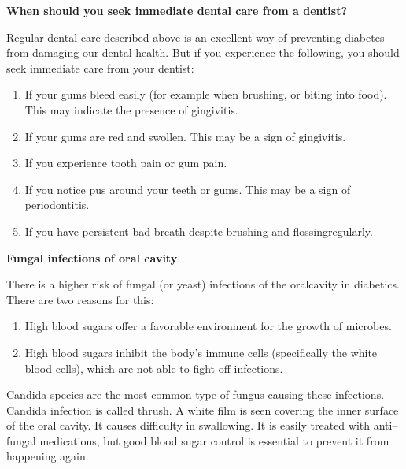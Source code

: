 \noindent\textbf{When should you seek immediate dental care from a dentist?}

Regular dental care described above is an excellent way of preve\-nting diabetes from damaging our dental health. But if you experience the following, you should seek immediate care from your dentist:

\vspace{-\topsep}
\begin{enumerate}[•]
\itemsep=0pt
\item If your gums bleed easily (for example when brushing, or biting into food). This may indicate the presence of gingivitis.
\item If your gums are red and swollen. This may be a sign of gingivitis.
\item If you experience tooth pain or gum pain.
\item If you notice pus around your teeth or gums. This may be a sign of periodontitis.
\item If you have persistent bad breath despite brushing and flossing\break regularly.
\end{enumerate}
\vspace{-\topsep}

\noindent\textbf{Fungal infections of oral cavity}

There is a higher risk of fungal (or yeast) infections of the oral\break cavity in diabetics. There are two reasons for this:

\vspace{-\topsep}
\begin{enumerate}[•]
\itemsep=0pt
\item High blood sugars offer a favorable environment for the growth of microbes.
\item High blood sugars inhibit the body’s immune cells (specifically the white blood cells), which are not able to fight off infections.
\end{enumerate}
\vspace{-\topsep}

Candida species are the most common type of fungus causing these infections. Candida infection is called thrush. A white film is seen covering the inner surface of the oral cavity. It causes difficulty in swallowing. It is easily treated with anti–fungal medications, but good blood sugar control is essential to prevent it from happening again.

\newpage

\renewcommand{\thechapter}{\arabic{chapter}}
